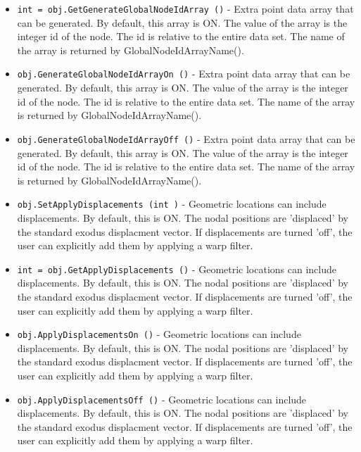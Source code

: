 \begin{itemize}
\item  \verb|int = obj.GetGenerateGlobalNodeIdArray ()| -  Extra point data array that can be generated.  By default, this array
 is ON.  The value of the array is the integer id of the node.
 The id is relative to the entire data set.
 The name of the array is returned by GlobalNodeIdArrayName().

\item  \verb|obj.GenerateGlobalNodeIdArrayOn ()| -  Extra point data array that can be generated.  By default, this array
 is ON.  The value of the array is the integer id of the node.
 The id is relative to the entire data set.
 The name of the array is returned by GlobalNodeIdArrayName().

\item  \verb|obj.GenerateGlobalNodeIdArrayOff ()| -  Extra point data array that can be generated.  By default, this array
 is ON.  The value of the array is the integer id of the node.
 The id is relative to the entire data set.
 The name of the array is returned by GlobalNodeIdArrayName().

\item  \verb|obj.SetApplyDisplacements (int )| -  Geometric locations can include displacements.  By default, 
 this is ON.  The nodal positions are 'displaced' by the
 standard exodus displacment vector. If displacements
 are turned 'off', the user can explicitly add them by
 applying a warp filter.

\item  \verb|int = obj.GetApplyDisplacements ()| -  Geometric locations can include displacements.  By default, 
 this is ON.  The nodal positions are 'displaced' by the
 standard exodus displacment vector. If displacements
 are turned 'off', the user can explicitly add them by
 applying a warp filter.

\item  \verb|obj.ApplyDisplacementsOn ()| -  Geometric locations can include displacements.  By default, 
 this is ON.  The nodal positions are 'displaced' by the
 standard exodus displacment vector. If displacements
 are turned 'off', the user can explicitly add them by
 applying a warp filter.

\item  \verb|obj.ApplyDisplacementsOff ()| -  Geometric locations can include displacements.  By default, 
 this is ON.  The nodal positions are 'displaced' by the
 standard exodus displacment vector. If displacements
 are turned 'off', the user can explicitly add them by
 applying a warp filter.


\end{itemize}
